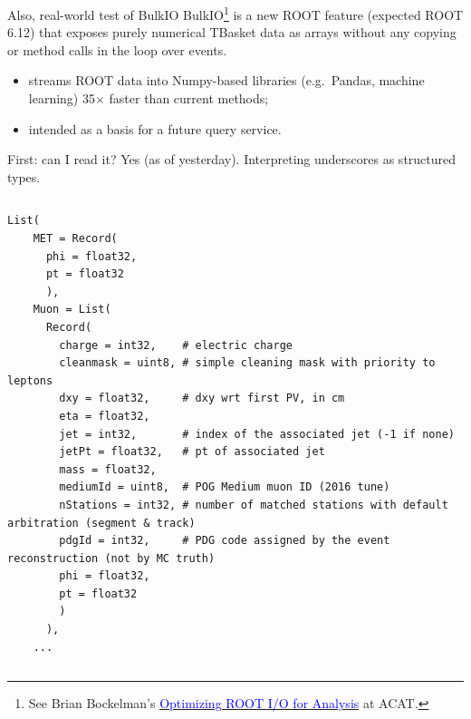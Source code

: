 \documentclass{beamer}
\begin{document}
\begin{frame}{Also, real-world test of BulkIO}
\vspace{0.5 cm}
BulkIO\footnote{See Brian Bockelman's \href{https://indico.cern.ch/event/567550/contributions/2627167/}{\textcolor{blue}{Optimizing ROOT I/O for Analysis}} at ACAT.} is a new ROOT feature (expected ROOT 6.12) that exposes purely numerical TBasket data as arrays without any copying or method calls in the loop over events.

\vspace{0.75 cm}

\vspace{0.25 cm}
\begin{itemize}\setlength{\itemsep}{0.5 cm}
\item<3-> streams ROOT data into Numpy-based libraries (e.g.\ Pandas, machine learning) 35$\times$ faster than current methods;
\item<4-> intended as a basis for a future query service.
\end{itemize}
\end{frame}

\begin{frame}[fragile]{First: can I read it?}
\vspace{0.5 cm}
Yes (as of yesterday). Interpreting underscores as structured types.

\begin{columns}
\scriptsize
\begin{verbatim}
List(
    MET = Record(
      phi = float32,
      pt = float32
      ),
    Muon = List(
      Record(
        charge = int32,    # electric charge
        cleanmask = uint8, # simple cleaning mask with priority to leptons
        dxy = float32,     # dxy wrt first PV, in cm
        eta = float32,
        jet = int32,       # index of the associated jet (-1 if none)
        jetPt = float32,   # pt of associated jet
        mass = float32,
        mediumId = uint8,  # POG Medium muon ID (2016 tune)
        nStations = int32, # number of matched stations with default arbitration (segment & track)
        pdgId = int32,     # PDG code assigned by the event reconstruction (not by MC truth)
        phi = float32,
        pt = float32
        )
      ),
    ...
\end{verbatim}
\end{columns}
\end{frame}
\end{document}
